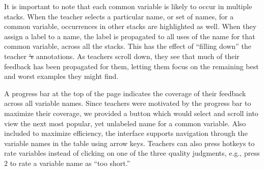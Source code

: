 \documentclass[12pt,twoside]{mitthesis}
\providecommand{\DIFaddtex}[1]{{\protect\color{blue}\uwave{#1}}} %
\providecommand{\DIFdeltex}[1]{{\protect\color{red}\sout{#1}}}                      %
\providecommand{\DIFaddbegin}{} %
\providecommand{\DIFaddend}{} %
\providecommand{\DIFdelbegin}{} %
\providecommand{\DIFdelend}{} %
\providecommand{\DIFadd}[1]{\texorpdfstring{\DIFaddtex{#1}}{#1}} %
\providecommand{\DIFdel}[1]{\texorpdfstring{\DIFdeltex{#1}}{}} %
\begin{document}
It is important to note that each common variable is likely to occur in multiple stacks. When the teacher selects a particular name, or set of names, for a common variable, occurrences in other stacks are highlighted as well. When they assign a label to a name, the label is propagated to all uses of the name for that common variable, across all the stacks. This has the effect of ``filling down'' the teacher \DIFdelbegin \DIFdel{'s }\DIFdelend annotations. As teachers scroll down, they see that much of their feedback has been propagated for them, letting them focus on the remaining best and worst examples they might find. 

A progress bar at the top of the page indicates the coverage of their feedback across all variable names. Since teachers were motivated by the progress bar to maximize their coverage, we provided a button which would select and scroll into view the next most popular, yet unlabeled name for a common variable. Also included to maximize efficiency, the interface supports navigation through the variable names in the table using arrow keys. Teachers can also press hotkeys to rate variables instead of clicking on one of the three quality judgments, e.g., press \DIFdelbegin \DIFdel{$2$ }\DIFdelend \DIFaddbegin \texttt{\DIFadd{2}} \DIFaddend to rate a variable name as ``too short.''
\end{document}
